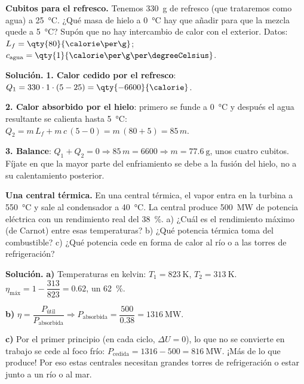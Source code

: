 \begin{example}
    \textbf{Cubitos para el refresco.} Tenemos \qty{330}{\g} de refresco (que trataremos como agua) a \qty{25}{\degreeCelsius}. ¿Qué
    masa de hielo a \qty{0}{\degreeCelsius} hay que añadir para que la mezcla quede a \qty{5}{\degreeCelsius}? Supón que no hay
    intercambio de calor con el exterior. Datos: \(L_f = \qty{80}{\calorie\per\g}\); \(c_{\text{agua}} =
    \qty{1}{\calorie\per\g\per\degreeCelsius}\).

    \textbf{Solución.} \textbf{1. Calor cedido por el refresco}:
    \(Q_1 = 330 \cdot 1 \cdot (5 - 25) = \qty{-6600}{\calorie}\).

    \textbf{2. Calor absorbido por el hielo}: primero se funde a \qty{0}{\degreeCelsius} y después el agua resultante se calienta hasta
    \qty{5}{\degreeCelsius}: \(Q_2 = m\,L_f + m\,c\,(5 - 0) = m\,(80 + 5) = 85\,m\).

    \textbf{3. Balance}: \(Q_1 + Q_2 = 0 \Rightarrow 85\,m = 6600 \Rightarrow m = \qty{77.6}{\g}\), unos cuatro cubitos. Fíjate
    en que la mayor parte del enfriamiento se debe a la fusión del hielo, no a su calentamiento posterior.
\end{example}

\begin{example}
    \textbf{Una central térmica.} En una central térmica, el vapor entra en la turbina a \qty{550}{\degreeCelsius} y sale al
    condensador a \qty{40}{\degreeCelsius}. La central produce \qty{500}{\mega\watt} de potencia eléctrica con un rendimiento real del
    \qty{38}{\percent}. a) ¿Cuál es el rendimiento máximo (de Carnot) entre esas temperaturas? b) ¿Qué potencia térmica toma del
    combustible? c) ¿Qué potencia cede en forma de calor al río o a las torres de refrigeración?

    \textbf{Solución.} \textbf{a)} Temperaturas en kelvin: \(T_1 = \qty{823}{\kelvin}\), \(T_2 = \qty{313}{\kelvin}\).
    \(\eta_{\text{máx}} = 1 - \dfrac{313}{823} = \num{0.62}\), un \qty{62}{\percent}.

    \textbf{b)} \(\eta = \dfrac{P_{\text{útil}}}{P_{\text{absorbida}}} \Rightarrow P_{\text{absorbida}} = \dfrac{500}{\num{0.38}} =
    \qty{1316}{\mega\watt}\).

    \textbf{c)} Por el primer principio (en cada ciclo, \(\Delta U = 0\)), lo que no se convierte en trabajo se cede al foco frío:
    \(P_{\text{cedida}} = 1316 - 500 = \qty{816}{\mega\watt}\). ¡Más de lo que produce! Por eso estas centrales necesitan grandes
    torres de refrigeración o estar junto a un río o al mar.
\end{example}

